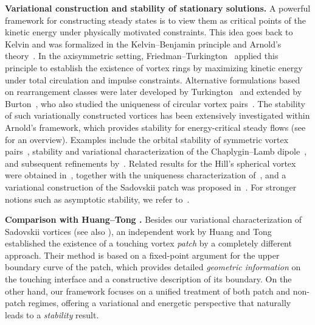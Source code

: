 \documentclass[11pt]{amsart}
\theoremstyle{definition}
\theoremstyle{definition}
\numberwithin{equation}{section}
\newcommand{\0}{\emptyset}
\begin{document}
	\noindent\textbf{Variational construction and stability of stationary solutions.}
	A powerful framework for constructing steady states is to view them as critical points of the kinetic energy under physically motivated constraints.
	This idea goes back to Kelvin and was formalized in the Kelvin--Benjamin principle \cite{Ben1976} and Arnold’s theory~\cite{Arn1966}.
	In the axisymmetric setting, Friedman--Turkington~\cite{FT1981} applied this principle to establish the existence of vortex rings by maximizing kinetic energy under total circulation and impulse constraints.
	Alternative formulations based on rearrangement classes were later developed by Turkington~\cite{Tur1983} and extended by Burton~\cite{Bur1987, Bur1988}, who also studied the uniqueness of circular vortex pairs~\cite{Bur1996}.
	The stability of such variationally constructed vortices has been extensively investigated within Arnold’s framework, which provides 
        stability for energy-critical steady flows (see~\cite{GS2024} for an overview).
	Examples include the orbital stability of symmetric vortex pairs~\cite{BNL2013},   stability and variational characterization of the Chaplygin--Lamb dipole~\cite{AC2022}, and subsequent refinements by~\cite{Wang2024, ACJ2025}.
	Related results for the Hill’s spherical vortex were obtained in~\cite{Choi2024}, together with the uniqueness characterization of~\cite{AF1986}, and a variational construction of the Sadovskii patch was proposed in~\cite{CJS2025}.
	For stronger notions such as asymptotic stability, we refer to~\cite{BM2015, BCM2019, IJ2022, IJ2023, MZ23}.
	
	
	\medskip
	
	
	\noindent\textbf{Comparison with Huang--Tong \cite{HT2025}.}
	Besides our variational characterization of Sadovskii vortices (see also \cite{CJS2025, ACJ2025}), an independent work by Huang and Tong~\cite{HT2025} established the existence of a touching vortex \emph{patch} by a completely different approach.
	Their method is based on a fixed-point argument for the upper boundary curve of the patch, which provides detailed \emph{geometric information} on the touching interface and a constructive description of its boundary.
	On the other hand, our framework focuses on a unified treatment of both patch and non-patch regimes, offering a variational and energetic perspective that naturally leads to a \textit{stability} result.
	
	
	\medskip
	
\end{document}
